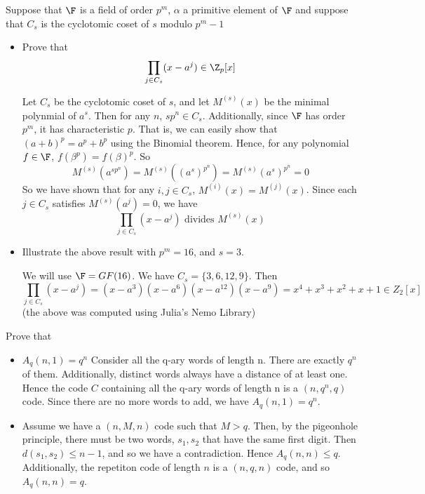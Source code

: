 \documentclass{homework}
\begin{document}
\begin{problem}

\end{problem}

\begin{problem}
  Suppose that $\F$ is a field of order $p^m$, $\alpha$ a primitive element of
  $\F$ and suppose that $C_s$ is the cyclotomic coset of $s$ modulo $p^m-1$
  \begin{itemize}
    \item Prove that \[
        \prod\limits_{j\in C_s} (x-a^j) \in \Z_p[x]
      \]

      Let $C_s$ be the cyclotomic coset of $s$, and let $M^{(s)}(x)$ be the minimal polynmial of $a^s$. Then
      for any $n$, $sp^n \in C_s$. Additionally, since $\F$ has order $p^m$, it has
      characteristic $p$. That is, we can easily show that $(a+b)^p = a^p+b^p$ using
      the Binomial theorem. Hence, for any polynomial $f \in \F$, $f(\beta^p) =
      f(\beta)^p$. So
      \[
        M^{(s)}(a^{sp^n})=M^{(s)}((a^s)^{p^n})=M^{(s)}(a^s)^{p^n}=0
      \]
      So we have shown that for any $i,j\in C_s$, $M^{(i)}(x)=M^{(j)}(x)$. Since
      each $j \in C_s$ satisfies $M^{(s)}(a^j) = 0$, we have  \[
        \prod\limits_{j\in C_s} (x-a^j) \text{  divides  } M^{(s)}(x)
      \] 

    \item
      Illustrate the above result with $p^m = 16$, and $s=3$.

      We will use $\F = GF(16)$. We have $C_s = \{3,6,12,9\}$. Then 
      \[
        \prod\limits_{j\in C_s} (x-a^j) = (x-a^3)(x-a^6)(x-a^{12})(x-a^9) =
        x^4+x^3+x^2+x+1 \in Z_2[x]  
      \] 
      (the above was computed using Julia's Nemo Library)

  \end{itemize}
\end{problem}

\begin{problem}
  Prove that
  \begin{itemize}
    \item $A_q(n,1) = q^n$
      Consider all the q-ary words of length n. There are exactly $q^n$ of them.
      Additionally, distinct words always have a distance of at least one. Hence
      the code $C$ containing all the q-ary words of length n is a $(n,q^n,q)$
      code. Since there are no more words to add, we have $A_q(n,1) = q^n$.

    \item
      Assume we have a $(n,M,n)$ code such that $M > q$. Then, by the pigeonhole
      principle, there must be two words, $s_1,s_2$ that have the same first
      digit. Then $d(s_1,s_2) \le n-1$, and so we have a contradiction. Hence
      $A_q(n,n) \le q$. Additionally, the repetiton code of length  $n$ is a
      $(n,q,n)$ code, and so $A_q(n,n) = q$.

  \end{itemize}
\end{problem}
\end{document}
